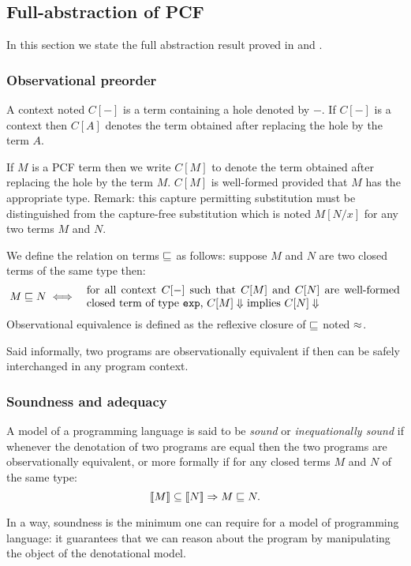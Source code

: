 \subsection{Full-abstraction of PCF}
In this section we state the full abstraction result proved in
\cite{abramsky94full} and \cite{hylandong_pcf}.


\subsubsection{Observational preorder}

A context noted $C[-]$ is a term containing a hole denoted by $-$.
If $C[-]$ is a context then $C[A]$ denotes the term obtained after
replacing the hole by the term $A$.

If $M$ is a PCF term then we write $C[M]$ to denote the term
obtained after replacing the hole by the term $M$. $C[M]$ is
well-formed provided that $M$ has the appropriate type. Remark: this
capture permitting substitution must be distinguished from the
capture-free substitution which is noted $M[N/x]$ for any two terms
$M$ and $N$.


\begin{dfn}
We define the relation on terms $\sqsubseteq$ as follows: suppose $M$
and $N$ are two closed terms of the same type then:
\begin{eqnarray*}
M \obspre N &\iff& \parbox{10cm}{for all context $C[-]$ such that
                $C[M]$ and $C[N]$ are well-formed closed term of type \texttt{exp},
                    $C[M] \eval$ implies $C[N] \eval$}
\end{eqnarray*}
Observational equivalence is defined as the reflexive closure of
$\sqsubseteq$ noted $\approx$.
\end{dfn}

Said informally, two programs are observationally equivalent if then
can be safely interchanged in any program context.

\subsubsection{Soundness and adequacy}
A model of a programming language is said to be \emph{sound} or
\emph{inequationally sound} if whenever the denotation of two
programs are equal then the two programs are observationally
equivalent, or more formally if for any closed terms $M$ and $N$ of
the same type:
$$ {[\![ M ]\!]} \subseteq {[\![N ]\!]} \Rightarrow M \sqsubseteq N.$$

In a way, soundness is the minimum one can require for a model of
programming language: it guarantees that we can reason about the
program by manipulating the object of the denotational model.

